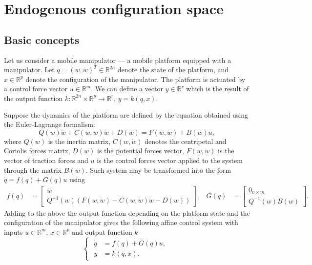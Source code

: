 \chapter{Endogenous configuration space}
\label{ch:endogen}
\section{Basic concepts}
Let us consider a mobile manipulator --- a mobile platform equipped with a manipulator. Let $q = (w, \dot w)^T \in \mathbb{R}^{2n}$ denote the state of the platform, and $x \in \mathbb{R}^p$ denote the configuration of the manipulator. The platform is actuated by a control force vector $u \in \mathbb{R}^m$. We can define a vector $y \in \mathbb{R}^r$ which is the result of the output function $k: \mathbb{R}^{2n} \times \mathbb{R}^p \rightarrow \mathbb{R}^r$, $y=k(q,x)$. 

Suppose the dynamics of the platform are defined by the equation obtained using the Euler-Lagrange formalism:
\begin{equation}
Q(w)\ddot w + C(w, \dot{w})\dot{w}+D(w)=F(w, \dot w)+B(w)u,
\end{equation}
where $Q(w)$ is the inertia matrix, $C(w, \dot w)$ denotes the centripetal and Coriolis forces matrix,
$D(w)$ is the potential forces vector, $F(w, \dot w)$ is the vector of traction forces and $u$ is the
control forces vector applied to the system through the matrix $B(w)$.
Such system may be transformed into the form $\dot q = f(q) + G(q)u$ using
\begin{equation}
\begin{aligned}
f(q)&=\begin{bmatrix}
\dot{w}\\
Q^{-1}(w)\left(F(w, \dot w)-C(w, \dot{w})\dot{w}-D(w)\right)
\end{bmatrix}, & G(q)&=\begin{bmatrix}
0_{n\times m}\\
Q^{-1}(w)B(w)
\end{bmatrix}.
\end{aligned}
\end{equation}
Adding to the above the output function depending on the platform state and the configuration of the manipulator gives the following affine control system with inputs
$u \in \mathbb{R}^m$, $x \in \mathbb{R}^p$ and output function $k$
\begin{equation}
\begin{cases}
\begin{aligned}
\label{eq:control_sys}
\dot q &= f(q) + G(q)u,\\
y &= k(q, x).
\end{aligned}
\end{cases}
\end{equation}

